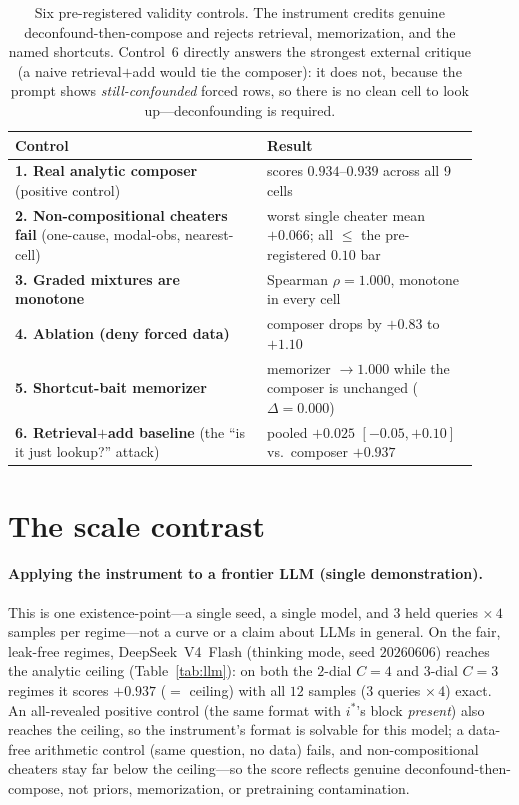 \documentclass[11pt]{article}
\newcommand{\istar}{i^{\!*}}
\begin{document}
\begin{table}[t]
\centering
\small
\begin{tabular}{p{0.50\linewidth}p{0.42\linewidth}}
\toprule
Control & Result\\
\midrule
\textbf{1. Real analytic composer} (positive control) & scores $0.934$--$0.939$ across all 9 cells\\
\textbf{2. Non-compositional cheaters fail} (one-cause, modal-obs, nearest-cell) & worst single cheater
mean $+0.066$; all $\leq$ the pre-registered $0.10$ bar\\
\textbf{3. Graded mixtures are monotone} & Spearman $\rho=1.000$, monotone in every cell\\
\textbf{4. Ablation (deny forced data)} & composer drops by $+0.83$ to $+1.10$\\
\textbf{5. Shortcut-bait memorizer} & memorizer $\to 1.000$ while the composer is unchanged
($\Delta=0.000$)\\
\textbf{6. Retrieval$+$add baseline} (the ``is it just lookup?'' attack) & pooled $+0.025$
$[-0.05,+0.10]$ vs.\ composer $+0.937$\\
\bottomrule
\end{tabular}
\caption{Six pre-registered validity controls. The instrument credits genuine deconfound-then-compose and
rejects retrieval, memorization, and the named shortcuts. Control~6 directly answers the strongest external
critique (a naive retrieval$+$add would tie the composer): it does not, because the prompt shows
\emph{still-confounded} forced rows, so there is no clean cell to look up---deconfounding is required.}
\label{tab:validity}
\end{table}

\section{The scale contrast}\label{sec:results}

\paragraph{Applying the instrument to a frontier LLM (single demonstration).}
This is one existence-point---a single seed, a single model, and $3$ held queries $\times\,4$ samples per
regime---not a curve or a claim about LLMs in general. On the fair, leak-free regimes, DeepSeek~V4~Flash
(thinking mode, seed $20260606$) reaches the analytic ceiling (Table~\ref{tab:llm}): on both the $2$-dial
$C{=}4$ and $3$-dial $C{=}3$ regimes it scores $+0.937$ ($=$ ceiling) with all $12$ samples
($3$ queries $\times\,4$) exact. An all-revealed positive control (the same format with $\istar$'s block
\emph{present}) also reaches the ceiling, so the instrument's format is solvable for this model; a data-free
arithmetic control (same question, no data) fails, and non-compositional cheaters stay far below the
ceiling---so the score reflects genuine deconfound-then-compose, not priors, memorization, or pretraining
contamination.
\end{document}
